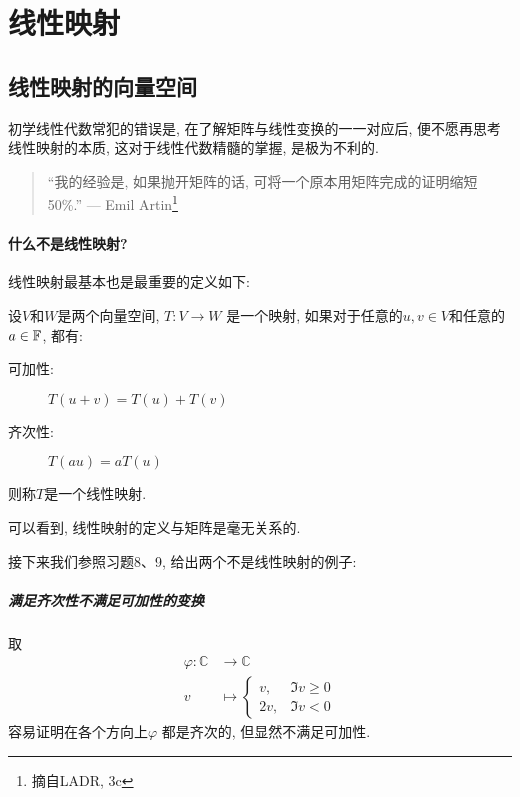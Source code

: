 \chapter{线性映射}
\section{线性映射的向量空间}
初学线性代数常犯的错误是, 在了解矩阵与线性变换的一一对应后, 便不愿再思考线性映射的本质, 这对于线性代数精髓的掌握, 是极为不利的.
\begin{quote}
    ``我的经验是, 如果抛开矩阵的话, 可将一个原本用矩阵完成的证明缩短 50\%.''
    \hfill --- Emil Artin\footnote{摘自LADR, 3c}
\end{quote}
\subsubsection{什么不是线性映射?}
线性映射最基本也是最重要的定义如下:
\begin{definition}
    设\(V\)和\(W\)是两个向量空间, \(T: V \to W\) 是一个映射, 如果对于任意的\(u,
    v \in V\)和任意的\(a \in \mathbb{F}\), 都有:
    \begin{description}
        \item[可加性:] \(T(u+v)=T(u)+T(v)\)
        \item[齐次性:] \(T(a u) = a T(u)\)
    \end{description}
    则称\(T\)是一个线性映射.
\end{definition}
可以看到, 线性映射的定义与矩阵是毫无关系的.

接下来我们参照习题8、9, 给出两个不是线性映射的例子:

\paragraph{满足齐次性不满足可加性的变换}
取
\begin{align*}
    \varphi: \mathbb{C} &\to \mathbb{C} \\
    v &\mapsto
    \begin{cases}
        v, &\Im v \geq 0 \\
        2v, &\Im v < 0
    \end{cases}
\end{align*}
容易证明在各个方向上\(\varphi\) 都是齐次的, 但显然不满足可加性.

